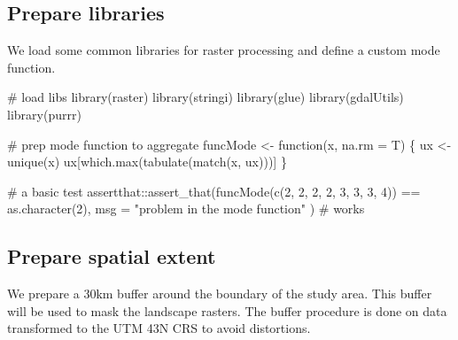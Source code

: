 \documentclass[]{article}
\newenvironment{Shaded}{}{}
\newcommand{\CommentTok}[1]{\textcolor[rgb]{0.00,0.50,0.00}{#1}}
\newcommand{\ControlFlowTok}[1]{\textcolor[rgb]{0.00,0.00,1.00}{#1}}
\newcommand{\DataTypeTok}[1]{#1}
\newcommand{\DecValTok}[1]{#1}
\newcommand{\FloatTok}[1]{#1}
\newcommand{\KeywordTok}[1]{\textcolor[rgb]{0.00,0.00,1.00}{#1}}
\newcommand{\NormalTok}[1]{#1}
\newcommand{\OperatorTok}[1]{#1}
\newcommand{\StringTok}[1]{\textcolor[rgb]{0.00,0.50,0.50}{#1}}
\begin{document}
\hypertarget{prepare-libraries}{%
\subsection{Prepare libraries}\label{prepare-libraries}}

We load some common libraries for raster processing and define a custom mode function.

\begin{Shaded}
\begin{Highlighting}[]

\CommentTok{# load libs}
\KeywordTok{library}\NormalTok{(raster)}
\KeywordTok{library}\NormalTok{(stringi)}
\KeywordTok{library}\NormalTok{(glue)}
\KeywordTok{library}\NormalTok{(gdalUtils)}
\KeywordTok{library}\NormalTok{(purrr)}

\CommentTok{# prep mode function to aggregate}
\NormalTok{funcMode <-}\StringTok{ }\ControlFlowTok{function}\NormalTok{(x, }\DataTypeTok{na.rm =}\NormalTok{ T) \{}
\NormalTok{  ux <-}\StringTok{ }\KeywordTok{unique}\NormalTok{(x)}
\NormalTok{  ux[}\KeywordTok{which.max}\NormalTok{(}\KeywordTok{tabulate}\NormalTok{(}\KeywordTok{match}\NormalTok{(x, ux)))]}
\NormalTok{\}}

\CommentTok{# a basic test}
\NormalTok{assertthat}\OperatorTok{::}\KeywordTok{assert_that}\NormalTok{(}\KeywordTok{funcMode}\NormalTok{(}\KeywordTok{c}\NormalTok{(}\DecValTok{2}\NormalTok{, }\DecValTok{2}\NormalTok{, }\DecValTok{2}\NormalTok{, }\DecValTok{2}\NormalTok{, }\DecValTok{3}\NormalTok{, }\DecValTok{3}\NormalTok{, }\DecValTok{3}\NormalTok{, }\DecValTok{4}\NormalTok{)) }\OperatorTok{==}\StringTok{ }\KeywordTok{as.character}\NormalTok{(}\DecValTok{2}\NormalTok{),}
  \DataTypeTok{msg =} \StringTok{"problem in the mode function"}
\NormalTok{) }\CommentTok{# works}
\end{Highlighting}
\end{Shaded}

\hypertarget{prepare-spatial-extent}{%
\subsection{Prepare spatial extent}\label{prepare-spatial-extent}}

We prepare a 30km buffer around the boundary of the study area. This buffer will be used to mask the landscape rasters.
The buffer procedure is done on data transformed to the UTM 43N CRS to avoid distortions.

\begin{Shaded}
\end{Shaded}
\end{document}
